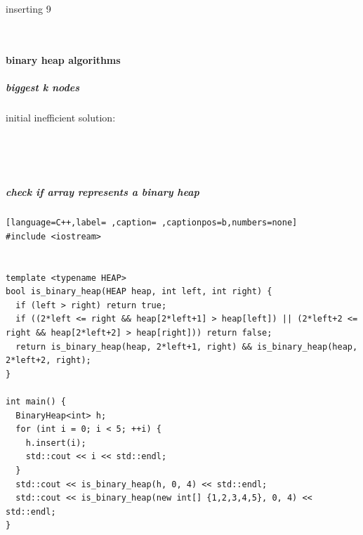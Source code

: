 \documentclass[a4paper,12pt]{article}
\begin{document}
inserting 9\\[0pt]
\begin{center}

\end{center}\\[0pt]
\paragraph{binary heap algorithms}
\label{sec:orgbedcfa3}
\subparagraph{biggest k nodes}
\label{sec:org360ed48}
initial inefficient solution:\\[0pt]
\begin{center}

\end{center}\\[0pt]

\begin{center}

\end{center}\\[0pt]

\subparagraph{check if array represents a binary heap}
\label{sec:orgfbce1e0}
\begin{lstlisting}[language=C++,label= ,caption= ,captionpos=b,numbers=none]
#include <iostream>


template <typename HEAP>
bool is_binary_heap(HEAP heap, int left, int right) {
  if (left > right) return true;
  if ((2*left <= right && heap[2*left+1] > heap[left]) || (2*left+2 <= right && heap[2*left+2] > heap[right])) return false;
  return is_binary_heap(heap, 2*left+1, right) && is_binary_heap(heap, 2*left+2, right);
}

int main() {
  BinaryHeap<int> h;
  for (int i = 0; i < 5; ++i) {
    h.insert(i);
    std::cout << i << std::endl;
  }
  std::cout << is_binary_heap(h, 0, 4) << std::endl;
  std::cout << is_binary_heap(new int[] {1,2,3,4,5}, 0, 4) << std::endl;
}
\end{lstlisting}
\end{document}
